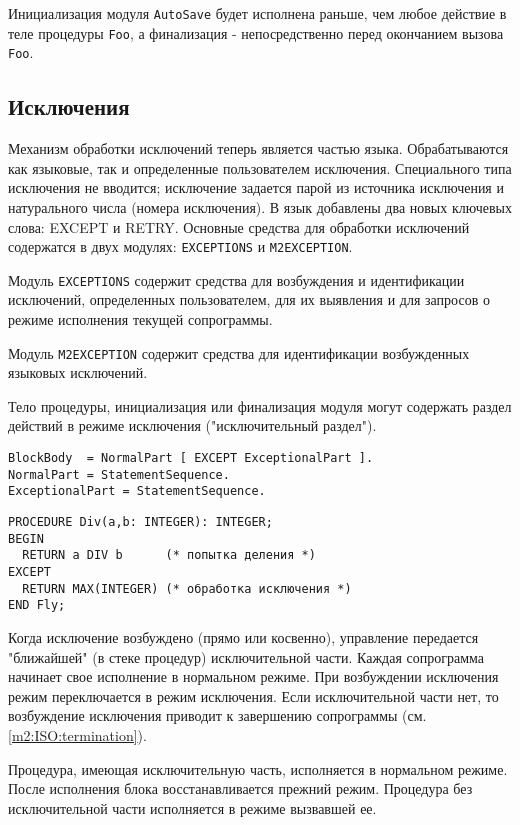 Инициализация модуля {\tt AutoSave} будет исполнена раньше, чем
любое действие в теле процедуры
{\tt Foo}, а финализация - непосредственно перед окончанием вызова
{\tt Foo}.

\subsection{Исключения}\label{m2:ISO:exc}

Механизм обработки исключений теперь является частью языка.
Обрабатываются как языковые, так и определенные пользователем
исключения. Специального типа исключения не вводится; исключение
задается парой из источника исключения и натурального числа
(номера исключения). 
В язык добавлены два новых ключевых слова: EXCEPT и RETRY.
Основные средства для обработки исключений содержатся в
двух модулях: {\tt EXCEPTIONS} и {\tt M2EXCEPTION}.

Модуль {\tt EXCEPTIONS} содержит средства для возбуждения и
идентификации исключений, определенных пользователем, для 
их выявления и для запросов о режиме исполнения текущей
сопрограммы.

Модуль {\tt M2EXCEPTION} содержит средства для идентификации 
возбужденных языковых исключений.

Тело процедуры, инициализация или финализация модуля могут содержать
раздел действий в режиме исключения ("исключительный раздел").
\begin{verbatim}
BlockBody  = NormalPart [ EXCEPT ExceptionalPart ].
NormalPart = StatementSequence.
ExceptionalPart = StatementSequence.
\end{verbatim}

\Example
\begin{verbatim}
PROCEDURE Div(a,b: INTEGER): INTEGER;
BEGIN
  RETURN a DIV b      (* попытка деления *)
EXCEPT
  RETURN MAX(INTEGER) (* обработка исключения *)
END Fly;
\end{verbatim}

Когда исключение возбуждено (прямо или косвенно), управление 
передается "ближайшей" (в стеке процедур) исключительной части.
Каждая сопрограмма начинает свое исполнение в нормальном режиме.
При возбуждении исключения режим переключается в режим исключения.
Если исключительной части нет, то возбуждение исключения приводит 
к завершению сопрограммы
(см. \ref{m2:ISO:termination}).

Процедура, имеющая исключительную часть, исполняется в нормальном 
режиме. После исполнения блока восстанавливается прежний режим.
Процедура без исключительной части исполняется в режиме вызвавшей ее.

